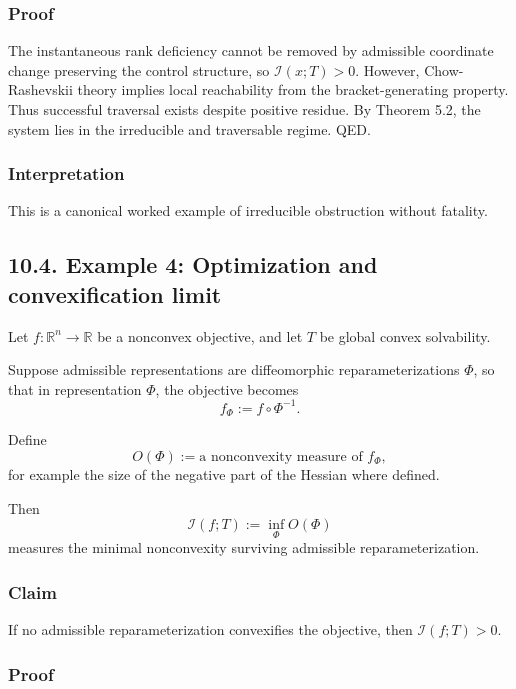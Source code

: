 \documentclass[
]{article}
\begin{document}
\subsubsection{Proof}\label{proof-9}

The instantaneous rank deficiency cannot be removed by admissible
coordinate change preserving the control structure, so
\(\mathcal{I}(x;T) > 0\). However, Chow-Rashevskii theory implies local
reachability from the bracket-generating property. Thus successful
traversal exists despite positive residue. By Theorem 5.2, the system
lies in the irreducible and traversable regime. QED.

\subsubsection{Interpretation}\label{interpretation-5}

This is a canonical worked example of irreducible obstruction without
fatality.

\subsection{10.4. Example 4: Optimization and convexification
limit}\label{example-4-optimization-and-convexification-limit}

Let \(f : \mathbb{R}^n \to \mathbb{R}\) be a nonconvex objective, and
let \(T\) be global convex solvability.

Suppose admissible representations are diffeomorphic reparameterizations
\(\Phi\), so that in representation \(\Phi\), the objective becomes \[
f_\Phi := f \circ \Phi^{-1}.
\]

Define \[
O(\Phi) := \text{a nonconvexity measure of } f_\Phi,
\] for example the size of the negative part of the Hessian where
defined.

Then \[
\mathcal{I}(f;T) := \inf_\Phi O(\Phi)
\] measures the minimal nonconvexity surviving admissible
reparameterization.

\subsubsection{Claim}\label{claim-3}

If no admissible reparameterization convexifies the objective, then
\(\mathcal{I}(f;T) > 0\).

\subsubsection{Proof}\label{proof-10}
\end{document}
